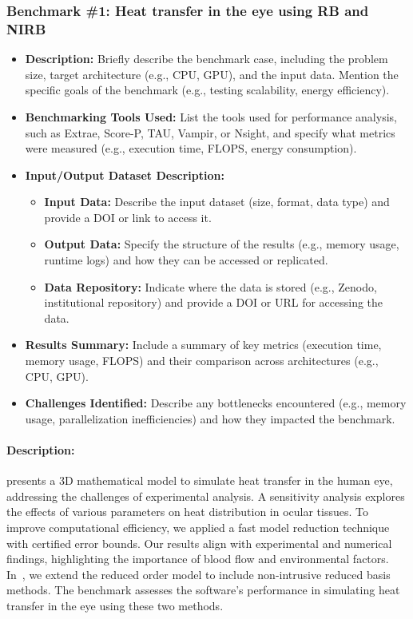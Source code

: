 \subsubsection{Benchmark \#1: Heat transfer in the eye using \ac{RB} and \ac{NIRB}}
\begin{itemize}
    \item \textbf{Description:} Briefly describe the benchmark case, including the problem size, target architecture (e.g., CPU, GPU), and the input data. Mention the specific goals of the benchmark (e.g., testing scalability, energy efficiency).
    \item \textbf{Benchmarking Tools Used:} List the tools used for performance analysis, such as Extrae, Score-P, TAU, Vampir, or Nsight, and specify what metrics were measured (e.g., execution time, FLOPS, energy consumption).
    \item \textbf{Input/Output Dataset Description:}
        \begin{itemize}
            \item \textbf{Input Data:} Describe the input dataset (size, format, data type) and provide a DOI or link to access it.
            \item \textbf{Output Data:} Specify the structure of the results (e.g., memory usage, runtime logs) and how they can be accessed or replicated.
            \item \textbf{Data Repository:} Indicate where the data is stored (e.g., Zenodo, institutional repository) and provide a DOI or URL for accessing the data.
        \end{itemize}
    \item \textbf{Results Summary:} Include a summary of key metrics (execution time, memory usage, FLOPS) and their comparison across architectures (e.g., CPU, GPU).
    \item \textbf{Challenges Identified:} Describe any bottlenecks encountered (e.g., memory usage, parallelization inefficiencies) and how they impacted the benchmark.
\end{itemize}

\paragraph{Description:} \cite{saigre_model_2024} presents a 3D mathematical model to simulate heat transfer in the human eye, addressing the challenges of experimental analysis. A sensitivity analysis explores the effects of various parameters on heat distribution in ocular tissues. To improve computational efficiency, we applied a fast model reduction technique with certified error bounds. Our results align with experimental and numerical findings, highlighting the importance of blood flow and environmental factors. In~\cite{saigre_mathematical_2024}, we extend the reduced order model to include non-intrusive reduced basis methods. The benchmark assesses the software's performance in simulating heat transfer in the eye using these two methods.

